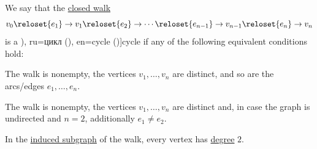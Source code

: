 \begin{definition}\label{def:graph_cycle}
  We say that the \hyperref[def:graph_walk/closed]{closed walk}
  \begin{equation}\label{eq:def:graph_cycle}
    v_0 \reloset {e_1} \to v_1 \reloset {e_2} \to \cdots \reloset {e_{n-1}} \to v_{n-1} \reloset {e_n} \to v_n
  \end{equation}
  is a \term[bg=цикъл (\cite[11]{Мирчев2001Графи}), ru=цикл (\cite[279]{БелоусовТкачёв2004ДискретнаяМатематика}), en=cycle (\cite[13]{Harary1969GraphTheory})]{cycle} if any of the following equivalent conditions hold:
  \begin{thmenum}
     The walk is nonempty, the vertices \( v_1, \ldots, v_n \) are distinct, and so are the arcs/edges \( e_1, \ldots, e_n \).

    \mimprovised The walk is nonempty, the vertices \( v_1, \ldots, v_n \) are distinct and, in case the graph is undirected and \( n = 2 \), additionally \( e_1 \neq e_2 \).

     In the \hyperref[def:graph_walk/subobject]{induced subgraph} of the walk, every vertex has \hyperref[def:graph_cardinality/directed_degree]{degree} \( 2 \).
  \end{thmenum}
\end{definition}
